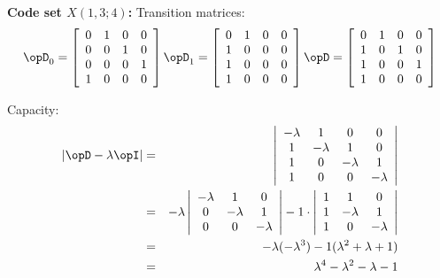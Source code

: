 \begin{example}{\bf Code set $X(1,3;4)$:}
Transition matrices:
\[
   \opD_0 = 
      \left[
         \begin{array}{*{8}{c}}
            0 & 1 & 0 & 0  \\
            0 & 0 & 1 & 0  \\
            0 & 0 & 0 & 1  \\
            1 & 0 & 0 & 0  
         \end{array}
      \right]
\hfill
   \opD_1 = 
      \left[
         \begin{array}{*{8}{c}}
            0 & 1 & 0 & 0  \\
            1 & 0 & 0 & 0  \\
            1 & 0 & 0 & 0  \\
            1 & 0 & 0 & 0  
         \end{array}
      \right]
\hfill
   \opD   = 
      \left[
         \begin{array}{*{8}{c}}
            0 & 1 & 0 & 0 \\
            1 & 0 & 1 & 0 \\
            1 & 0 & 0 & 1 \\
            1 & 0 & 0 & 0 
         \end{array}
      \right]
\]

Capacity:
\begin{eqnarray*}
   |\opD-\lambda \opI | 
     &=& \left|
            \begin{array}{*{8}{c}}
               -\lambda & 1        & 0        & 0 \\
               1        & -\lambda & 1        & 0 \\
               1        & 0        & -\lambda & 1 \\
               1        & 0        & 0        & -\lambda 
            \end{array}
         \right|
   \\&=& -\lambda \left|
            \begin{array}{*{8}{c}}
               -\lambda & 1        & 0 \\
               0        & -\lambda & 1 \\
               0        & 0        & -\lambda 
            \end{array}
         \right|
        -1\cdot\left|
            \begin{array}{*{8}{c}}
               1        & 1        & 0 \\
               1        & -\lambda & 1 \\
               1        & 0        & -\lambda 
            \end{array}
         \right|
   \\&=& -\lambda(-\lambda^3) -1(\lambda^2+\lambda+1)
   \\&=& \lambda^4 - \lambda^2 - \lambda - 1
\end{eqnarray*}


\end{example}
